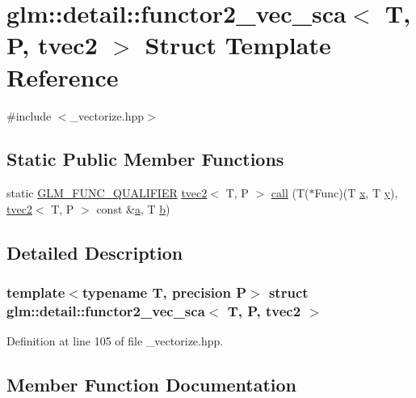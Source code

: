 \hypertarget{structglm_1_1detail_1_1functor2__vec__sca_3_01_t_00_01_p_00_01tvec2_01_4}{}\section{glm\+::detail\+::functor2\+\_\+vec\+\_\+sca$<$ T, P, tvec2 $>$ Struct Template Reference}
\label{structglm_1_1detail_1_1functor2__vec__sca_3_01_t_00_01_p_00_01tvec2_01_4}


{\ttfamily \#include $<$\+\_\+vectorize.\+hpp$>$}

\subsection*{Static Public Member Functions}
\begin{DoxyCompactItemize}
\item 
static \mbox{\hyperlink{setup_8hpp_a33fdea6f91c5f834105f7415e2a64407}{G\+L\+M\+\_\+\+F\+U\+N\+C\+\_\+\+Q\+U\+A\+L\+I\+F\+I\+ER}} \mbox{\hyperlink{structglm_1_1tvec2}{tvec2}}$<$ T, P $>$ \mbox{\hyperlink{structglm_1_1detail_1_1functor2__vec__sca_3_01_t_00_01_p_00_01tvec2_01_4_ad640cc49fdd9c6451bff02195a618c55}{call}} (T($\ast$Func)(T \mbox{\hyperlink{glad_8h_a92d0386e5c19fb81ea88c9f99644ab1d}{x}}, T \mbox{\hyperlink{glad_8h_a66ddd433d2cacfe27f5906b7e86faeed}{y}}), \mbox{\hyperlink{structglm_1_1tvec2}{tvec2}}$<$ T, P $>$ const \&\mbox{\hyperlink{glad_8h_ac8729153468b5dcf13f971b21d84d4e5}{a}}, T \mbox{\hyperlink{glad_8h_a6eba317e3cf44d6d26c04a5a8f197dcb}{b}})
\end{DoxyCompactItemize}


\subsection{Detailed Description}
\subsubsection*{template$<$typename T, precision P$>$\newline
struct glm\+::detail\+::functor2\+\_\+vec\+\_\+sca$<$ T, P, tvec2 $>$}



Definition at line 105 of file \+\_\+vectorize.\+hpp.



\subsection{Member Function Documentation}
\mbox{\label{structglm_1_1detail_1_1functor2__vec__sca_3_01_t_00_01_p_00_01tvec2_01_4_ad640cc49fdd9c6451bff02195a618c55}} 
